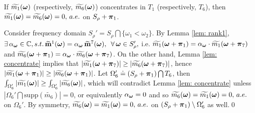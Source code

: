 \begin{proposition}\label{prop: zero-corner}
If  $\widetilde{m_{1}}(\boldsymbol{\omega})$ {\rm(}respectively, $\widetilde{m_{6}}(\boldsymbol{\omega})${\rm)} concentrates in $T_1$ {\rm(}respectively, $T_6${\rm)}, then $\widetilde{m_{1}}(\boldsymbol{\omega}) = \widetilde{m_{6}}(\boldsymbol{\omega}) = 0,\, a.e. $ on $ S_\rho + \boldsymbol{\pi}_1$.
\end{proposition}
Consider frequency domain $S_\rho' = S_\rho\bigcap\{\omega_1<\omega_2\}.$ By Lemma \ref{lem: rank1}, $\exists\,\alpha_{\boldsymbol{\omega}}\in\mathbb{C}, s.t.\,\widetilde{\mathbf{m}}^{1}(\boldsymbol{\omega}) = \alpha_{\boldsymbol{\omega}}\,\widetilde{\mathbf{m}}^{7}(\boldsymbol{\omega}),\,$ $\forall\, \boldsymbol{\omega}\in S_\rho',$ i.e. $\widetilde{m_1}(\boldsymbol{\omega} + \boldsymbol{\pi}_1) = \alpha_{\boldsymbol{\omega}}\cdot\widetilde{m_1}(\boldsymbol{\omega} + \boldsymbol{\pi}_7)$ and $\widetilde{m_6}(\boldsymbol{\omega} + \boldsymbol{\pi}_1) = \alpha_{\boldsymbol{\omega}}\cdot\widetilde{m_6}(\boldsymbol{\omega} + \boldsymbol{\pi}_7)$. On the other hand, Lemma \ref{lem: concentrate} implies that $|\widetilde{m_1}(\boldsymbol{\omega} + \boldsymbol{\pi}_7)| \geq |\widetilde{m_6}(\boldsymbol{\omega} + \boldsymbol{\pi}_7)|$, hence $|\widetilde{m_1}(\boldsymbol{\omega} + \boldsymbol{\pi}_1)| \geq |\widetilde{m_6}(\boldsymbol{\omega} + \boldsymbol{\pi}_1)|$. Let $\Omega_6'\doteq (S_\rho+\boldsymbol{\pi}_1)\bigcap T_6$, then $\int_{\Omega_6'}|\widetilde{m_{1}}(\boldsymbol{\omega})| \geq\int_{\Omega_6'}|\widetilde{m_{6}}(\boldsymbol{\omega})|$, which will contradict Lemma \ref{lem: concentrate} unless $|\Omega_6'\bigcap\text{supp}(\widetilde{m_6})| = 0$, or equivalently $\alpha_{\boldsymbol{\omega}}=0$ and so $\widetilde{m_{6}}(\boldsymbol{\omega}) = \widetilde{m_{1}}(\boldsymbol{\omega}) = 0,\,a.e.$ on $\Omega_6'$. By symmetry, $\widetilde{m_{6}}(\boldsymbol{\omega})=\widetilde{m_{1}}(\boldsymbol{\omega}) = 0,\,a.e. $ on $(S_\rho+\boldsymbol{\pi}_1)\setminus \Omega_6'$ as well.\qed

